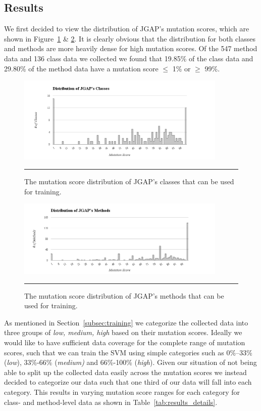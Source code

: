 \documentclass[conference]{IEEEtran}
\begin{document}
\subsection{Results}
\label{subsec:results}
We first decided to view the distribution of JGAP's mutation scores, which are shown in Figure~\ref{fig:mutation_class_distributions} \& \ref{fig:mutation_method_distributions}. It is clearly obvious that the distribution for both classes and methods are more heavily dense for high mutation scores. Of the 547 method data and 136 class data we collected we found that 19.85\% of the class data and 29.80\% of the method data have a mutation score $\le$ 1\% or $\ge$ 99\%.

\begin{figure}[!t]
  \centering
  \includegraphics[width=10cm]{figures/class_distribution.png} 
  \caption{The mutation score distribution of JGAP's classes that can be used for training.}
  \label{fig:mutation_class_distributions}
  \vspace{2mm}
  \hrule
\end{figure}

\begin{figure}[!t]
  \centering
  \includegraphics[width=10cm]{figures/method_distribution.png}
  \caption{The mutation score distribution of JGAP's methods that can be used for training.}
  \label{fig:mutation_method_distributions}
  \vspace{2mm}
  \hrule
\end{figure}

As mentioned in Section~\ref{subsec:training} we categorize the collected data into three groups of \textit{low, medium, high} based on their mutation scores. Ideally we would like to have sufficient data coverage for the complete range of mutation scores, such that we can train the SVM using simple categories such as 0\%--33\% (\textit{low}), 33\%-66\% (\textit{medium)} and 66\%-100\% (\textit{high}). Given our situation of not being able to split up the collected data easily across the mutation scores we instead decided to categorize our data such that one third of our data will fall into each category. This results in varying mutation score ranges for each category for class- and method-level data as shown in Table~\ref{tab:results_details}.
\end{document}
